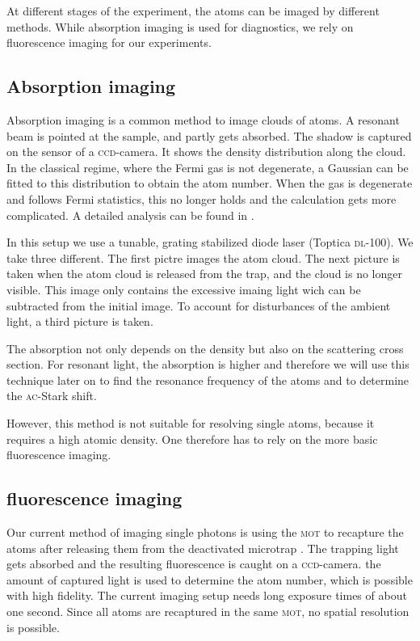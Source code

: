 At different stages of the experiment, the atoms can be imaged by different methods. While absorption imaging is used for diagnostics, we rely on fluorescence imaging for our experiments.

\subsection{Absorption imaging}

Absorption imaging is a common method to image clouds of atoms\cite{ketterle}. A resonant beam is pointed at the sample, and partly gets absorbed. The shadow is captured on the sensor of a \textsc{ccd}-camera. It shows the density distribution along the cloud. In the classical regime, where the Fermi gas is not degenerate, a Gaussian can be fitted to this distribution to obtain the atom number. When the gas is degenerate and follows Fermi statistics, this no longer holds and the calculation gets more complicated. A detailed analysis can be found in \cite{ketterle2}.

In this setup we use a tunable, grating stabilized diode laser (Toptica \textsc{dl}-100). We take three different. The first pictre images the atom cloud. The next picture is taken when the atom cloud is released from the trap, and the cloud is no longer visible. This image only contains the excessive imaing light wich can be subtracted from the initial image. To account for disturbances of the ambient light, a third picture is taken.

The absorption not only depends on the density but also on the scattering cross section. For resonant light, the absorption is higher and therefore we will use this technique later on to find the resonance frequency of the atoms and to determine the \textsc{ac}-Stark shift.

However, this method is not suitable for resolving single atoms, because it requires a high atomic density. One therefore has to rely on the more basic fluorescence imaging.

\subsection{fluorescence imaging}

Our current method of imaging single photons is using the \textsc{mot} to recapture the atoms after releasing them from the deactivated microtrap \cite{timo}. The trapping light gets absorbed and the resulting fluorescence is caught on a \textsc{ccd}-camera. the amount of captured light is used to determine the atom number, which is possible with high fidelity. The current imaging setup needs long exposure times of about one second. Since all atoms are recaptured in the same \textsc{mot}, no spatial resolution is possible.


